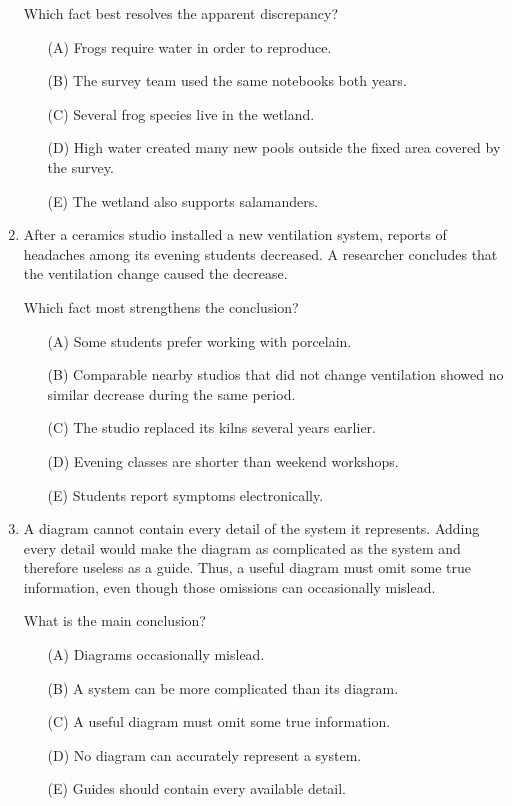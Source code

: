 \begin{enumerate}
Which fact best resolves the apparent discrepancy?
\begin{enumerate}
\item[(A)] Frogs require water in order to reproduce.
\item[(B)] The survey team used the same notebooks both years.
\item[(C)] Several frog species live in the wetland.
\item[(D)] High water created many new pools outside the fixed area covered by the survey.
\item[(E)] The wetland also supports salamanders.
\end{enumerate}

\item After a ceramics studio installed a new ventilation system, reports of headaches among its evening students decreased. A researcher concludes that the ventilation change caused the decrease.

Which fact most strengthens the conclusion?
\begin{enumerate}
\item[(A)] Some students prefer working with porcelain.
\item[(B)] Comparable nearby studios that did not change ventilation showed no similar decrease during the same period.
\item[(C)] The studio replaced its kilns several years earlier.
\item[(D)] Evening classes are shorter than weekend workshops.
\item[(E)] Students report symptoms electronically.
\end{enumerate}

\item A diagram cannot contain every detail of the system it represents. Adding every detail would make the diagram as complicated as the system and therefore useless as a guide. Thus, a useful diagram must omit some true information, even though those omissions can occasionally mislead.

What is the main conclusion?
\begin{enumerate}
\item[(A)] Diagrams occasionally mislead.
\item[(B)] A system can be more complicated than its diagram.
\item[(C)] A useful diagram must omit some true information.
\item[(D)] No diagram can accurately represent a system.
\item[(E)] Guides should contain every available detail.
\end{enumerate}


\end{enumerate}
